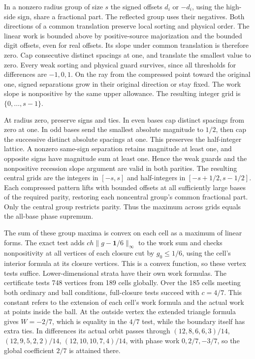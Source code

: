 \documentclass[11pt,reqno]{amsart}
\theoremstyle{remark}
\begin{document}
In a nonzero radius group of size \(s\) the signed offsets \(d_i\) or \(-d_i\), using the high-side sign, share a fractional part. The reflected group uses their negatives. Both directions of a common translation preserve local sorting and physical order. The linear work is bounded above by positive-source majorization and the bounded digit offsets, even for real offsets. Its slope under common translation is therefore zero. Cap consecutive distinct spacings at one, and translate the smallest value to zero. Every weak sorting and physical guard survives, since all thresholds for differences are \(-1,0,1\). On the ray from the compressed point toward the original one, signed separations grow in their original direction or stay fixed. The work slope is nonpositive by the same upper allowance. The resulting integer grid is \(\{0,\ldots,s-1\}\).

At radius zero, preserve signs and ties. In even bases cap distinct spacings from zero at one. In odd bases send the smallest absolute magnitude to \(1/2\), then cap the successive distinct absolute spacings at one. This preserves the half-integer lattice. A nonzero same-sign separation retains magnitude at least one, and opposite signs have magnitude sum at least one. Hence the weak guards and the nonpositive recession slope argument are valid in both parities. The resulting central grids are the integers in \([-s,s]\) and half-integers in \([-s+1/2,s-1/2]\). Each compressed pattern lifts with bounded offsets at all sufficiently large bases of the required parity, restoring each noncentral group's common fractional part. Only the central group restricts parity. Thus the maximum across grids equals the all-base phase supremum.

The sum of these group maxima is convex on each cell as a maximum of linear forms. The exact test adds \(c h\|g-\boldsymbol 1/6\|_\infty\) to the work sum and checks nonpositivity at all vertices of each closure cut by \(g_0\le1/6\), using the cell's interior formula at its closure vertices. This is a convex function, so these vertex tests suffice. Lower-dimensional strata have their own work formulas. The certificate tests 748 vertices from 189 cells globally. Over the 185 cells meeting both ordinary and ball conditions, full-closure tests succeed with \(c=4/7\). This constant refers to the extension of each cell's work formula and the actual work at points inside the ball. At the outside vertex the extended triangle formula gives \(W=-2/7\), which is equality in the \(4/7\) test, while the boundary itself has extra ties. In differences its actual orbit passes through \((12,8,6,6,3)/14\), \((12,9,5,2,2)/14\), \((12,10,10,7,4)/14\), with phase work \(0,2/7,-3/7\), so the global coefficient \(2/7\) is attained there.
\end{document}
